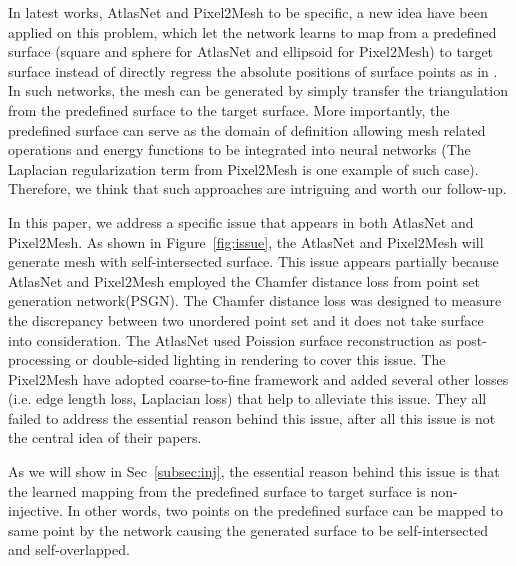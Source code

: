 In latest works, AtlasNet\cite{atlasnet} and Pixel2Mesh\cite{pixel2mesh} to be specific, a new idea have been applied on this problem, which let the network learns to map from a predefined surface (square and sphere for AtlasNet and ellipsoid for Pixel2Mesh) to target surface instead of directly regress the absolute positions of surface points as in \cite{PSGN}. In such networks, the mesh can be generated by simply transfer the triangulation from the predefined surface to the target surface. More importantly, the predefined surface can serve as the domain of definition allowing mesh related operations and energy functions to be integrated into neural networks (The Laplacian regularization term from Pixel2Mesh is one example of such case). Therefore, we think that such approaches are intriguing and worth our follow-up.

In this paper, we address a specific issue that appears in both AtlasNet\cite{atlasnet} and Pixel2Mesh\cite{pixel2mesh}. As shown in Figure~\ref{fig:issue}, the AtlasNet and Pixel2Mesh will generate mesh with self-intersected surface. This issue appears partially because AtlasNet and Pixel2Mesh employed the Chamfer distance loss from point set generation network(PSGN)\cite{PSGN}. The Chamfer distance loss was designed to measure the discrepancy between two unordered point set and it does not take surface into consideration. The AtlasNet used Poission surface reconstruction as post-processing or double-sided lighting in rendering to cover this issue. The Pixel2Mesh have adopted coarse-to-fine framework and added several other losses (i.e. edge length loss, Laplacian loss) that help to alleviate this issue. They all failed to address the essential reason behind this issue, after all this issue is not the central idea of their papers.

As we will show in Sec~\ref{subsec:inj}, the essential reason behind this issue is that the learned mapping from the predefined surface to target surface is non-injective. In other words, two points on the predefined surface can be mapped to same point by the network causing the generated surface to be self-intersected and self-overlapped. 

